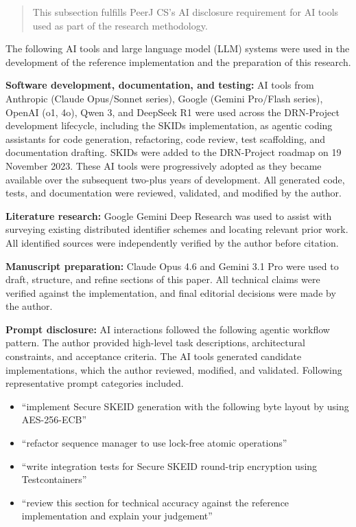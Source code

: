 \documentclass[fleqn,10pt,lineno]{wlpeerj}
\providecommand{\tightlist}{%
  \setlength{\itemsep}{0pt}\setlength{\parskip}{0pt}}
\begin{document}
\begin{quote}
This subsection fulfills PeerJ CS's AI disclosure requirement for AI
tools used as part of the research methodology.
\end{quote}

The following AI tools and large language model (LLM) systems were used
in the development of the reference implementation and the preparation
of this research.

\textbf{Software development, documentation, and testing:} AI tools from
Anthropic (Claude Opus/Sonnet series), Google (Gemini Pro/Flash series),
OpenAI (o1, 4o), Qwen 3, and DeepSeek R1 were used across the
DRN-Project development lifecycle, including the SKIDs implementation,
as agentic coding assistants for code generation, refactoring, code
review, test scaffolding, and documentation drafting. SKIDs were added
to the DRN-Project roadmap on 19 November 2023. These AI tools were
progressively adopted as they became available over the subsequent
two-plus years of development. All generated code, tests, and
documentation were reviewed, validated, and modified by the author.

\textbf{Literature research:} Google Gemini Deep Research was used to
assist with surveying existing distributed identifier schemes and
locating relevant prior work. All identified sources were independently
verified by the author before citation.

\textbf{Manuscript preparation:} Claude Opus 4.6 and Gemini 3.1 Pro were
used to draft, structure, and refine sections of this paper. All
technical claims were verified against the implementation, and final
editorial decisions were made by the author.

\textbf{Prompt disclosure:} AI interactions followed the following
agentic workflow pattern. The author provided high-level task
descriptions, architectural constraints, and acceptance criteria. The AI
tools generated candidate implementations, which the author reviewed,
modified, and validated. Following representative prompt categories
included.

\begin{itemize}
\tightlist
\item
  ``implement Secure SKEID generation with the following byte layout by
  using AES-256-ECB''
\item
  ``refactor sequence manager to use lock-free atomic operations''
\item
  ``write integration tests for Secure SKEID round-trip encryption using
  Testcontainers''
\item
  ``review this section for technical accuracy against the reference
  implementation and explain your judgement''
\end{itemize}
\end{document}
